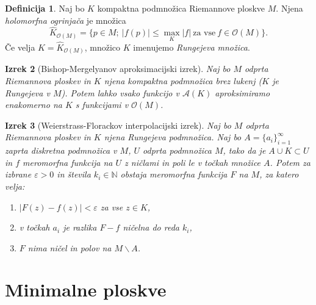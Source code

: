 \documentclass[12pt,a4paper,twoside]{article}
\theoremstyle{definition} %
\newtheorem{definicija}{Definicija}[section]
\theoremstyle{plain} %
\newtheorem{izrek}[definicija]{Izrek}
\numberwithin{equation}{section}  %
\newcommand{\N}{\mathbb N}
\begin{document}
\begin{definicija}
Naj bo $K$ kompaktna podmnožica Riemannove ploskve $M$. Njena \emph{holomorfna ogrinjača} je množica 
\begin{equation}
\widehat{K}_{\mathcal{O}(M)} = \{p \in M ; \ |f(p)| \leq \max_{K} |f| \ \text{za vse} \ f \in \mathcal{O}(M) \}.
\end{equation}
Če velja $K = \widehat{K}_{\mathcal{O}(M)}$, množico $K$ imenujemo \emph{Rungejeva množica}.
\end{definicija}

\begin{izrek} [Bishop-Mergelyanov aproksimacijski izrek] \label{izr:Bishop-Mergelyan}
Naj bo $M$ odprta Riemannova ploskev in $K$ njena kompaktna podmnožica brez lukenj ($K$ je Rungejeva v $M$). Potem lahko vsako funkcijo v $\mathcal{A}(K)$ aproksimiramo enakomerno na $K$ s funkcijami v $\mathcal{O}(M)$.
\end{izrek}

\begin{izrek} [Weierstrass-Florackov interpolacijski izrek]
Naj bo $M$ odprta Riemannova ploskev in $K$ njena Rungejeva podmnožica. Naj bo $A = \{ a_i \}_{i=1}^{\infty}$ zaprta diskretna podmnožica v $M$, $U$ odprta podmnožica $M$, tako da je $A \cup K \subset U$ in $f$ meromorfna funkcija na $U$ z ničlami in poli le v točkah množice $A$.
Potem za izbrane $\varepsilon > 0$ in števila $k_{i} \in \N$ obstaja meromorfna funkcija $F$ na $M$, za katero velja:
\begin{enumerate}
\item $|F(z) - f(z)| < \varepsilon$ za vse $z \in K$,
\item v točkah $a_i$ je razlika $F-f$ ničelna do reda $k_i$,
\item $F$ nima ničel in polov na $M \backslash A$.
\end{enumerate} 
\end{izrek}

\section{Minimalne ploskve}

\end{document}
